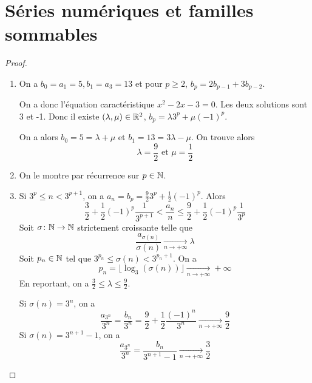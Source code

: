 \section{Séries numériques et familles sommables}

\begin{proof}
	\phantom{}
	\begin{enumerate}
		\item On a $b_{0}=a_{1}=5,b_{1}=a_{3}=13$ et pour $p\geqslant2$, $b_{p}=2b_{p-1}+3b_{p-2}$.
		
		On a donc l'équation caractéristique $x^{2}-2x-3=0$. Les deux solutions sont 3 et -1. Donc il existe $(\lambda,\mu)\in\mathbb{R}^{2}$, $b_{p}=\lambda 3^{p}+\mu(-1)^{p}$.

		On a alors $b_{0}=5=\lambda+\mu$ et $b_{1}=13=3\lambda-\mu$. On trouve alors 
		\begin{equation}
			\boxed{\lambda=\frac{9}{2} \text{ et } \mu=\frac{1}{2}}
		\end{equation}

		\item On le montre par récurrence sur $p\in\mathbb{N}$.
		
		\item Si $3^{p}\leqslant n<3^{p+1}$, on a $a_{n}=b_{p}=\frac{9}{2}3^{p}+\frac{1}{2}(-1)^{p}$.
		Alors 
		\begin{equation}\frac{3}{2}+\frac{1}{2}(-1)^{p}\frac{1}{3^{p+1}}<\frac{a_{n}}{n}\leqslant\frac{9}{2}+\frac{1}{2}(-1)^{p}\frac{1}{3^{p}}\end{equation}
		Soit $\sigma\colon\mathbb{N}\to\mathbb{N}$ strictement croissante telle que 
		\begin{equation}\frac{a_{\sigma(n)}}{\sigma(n)}\xrightarrow[n\to+\infty]{}\lambda\end{equation}
		Soit $p_{n}\in\mathbb{N}$ tel que $3^{p_{n}}\leqslant\sigma(n)<3^{p_{n}+1}$. On a 
		\begin{equation}p_{n}=\bigl\lfloor\log_{3}(\sigma(n))\bigr\rfloor\xrightarrow[n\to+\infty]{}+\infty\end{equation}
		En reportant, on a $\frac{3}{2}\leqslant\lambda\leqslant\frac{9}{2}$.

		Si $\sigma(n)=3^{n}$, on a 
		\begin{equation}\frac{a_{3^{n}}}{3^{n}}=\frac{b_{n}}{3^{n}}=\frac{9}{2}+\frac{1}{2}\frac{(-1)^{n}}{3^{n}}\xrightarrow[n\to+\infty]{}\frac{9}{2}\end{equation}
		Si $\sigma(n)=3^{n+1}-1$, on a 
		\begin{equation}\frac{a_{3^{n}}}{3^{n}}=\frac{b_{n}}{3^{n+1}-1}\xrightarrow[n\to+\infty]{}\frac{3}{2}\end{equation}


\end{enumerate}
\end{proof}
